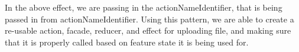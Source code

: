 In the above effect, we are passing in the actionNameIdentifier, that is being
passed in from actionNameIdentifier. Using this pattern, we are able to create a
re-usable action, facade, reducer, and effect for uploading file, and making
sure that it is properly called based on feature state it is being used for.
